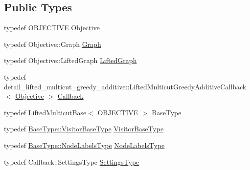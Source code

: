 \subsection*{Public Types}
\begin{DoxyCompactItemize}
\item 
typedef O\+B\+J\+E\+C\+T\+I\+V\+E \hyperlink{classnifty_1_1graph_1_1optimization_1_1lifted__multicut_1_1LiftedMulticutGreedyAdditive_ab91462949e43bb7acc99bf76e9199eb1}{Objective}
\item 
typedef Objective\+::\+Graph \hyperlink{classnifty_1_1graph_1_1optimization_1_1lifted__multicut_1_1LiftedMulticutGreedyAdditive_a1c36d77eb80c7a1f831580d9bd317a2a}{Graph}
\item 
typedef Objective\+::\+Lifted\+Graph \hyperlink{classnifty_1_1graph_1_1optimization_1_1lifted__multicut_1_1LiftedMulticutGreedyAdditive_a15aabdbf9adee9f89b5108d75699172f}{Lifted\+Graph}
\item 
typedef detail\+\_\+lifted\+\_\+multicut\+\_\+greedy\+\_\+additive\+::\+Lifted\+Multicut\+Greedy\+Additive\+Callback$<$ \hyperlink{classnifty_1_1graph_1_1optimization_1_1lifted__multicut_1_1LiftedMulticutGreedyAdditive_ab91462949e43bb7acc99bf76e9199eb1}{Objective} $>$ \hyperlink{classnifty_1_1graph_1_1optimization_1_1lifted__multicut_1_1LiftedMulticutGreedyAdditive_abf11c8446b89d894ab323829ffdd9860}{Callback}
\item 
typedef \hyperlink{classnifty_1_1graph_1_1optimization_1_1lifted__multicut_1_1LiftedMulticutBase}{Lifted\+Multicut\+Base}$<$ O\+B\+J\+E\+C\+T\+I\+V\+E $>$ \hyperlink{classnifty_1_1graph_1_1optimization_1_1lifted__multicut_1_1LiftedMulticutGreedyAdditive_a6829b614366e47118c6cb428ba5496e9}{Base\+Type}
\item 
typedef \hyperlink{classnifty_1_1graph_1_1optimization_1_1common_1_1SolverBase_a5a14d64c70a9cc0eebc7d71d2b089f9b}{Base\+Type\+::\+Visitor\+Base\+Type} \hyperlink{classnifty_1_1graph_1_1optimization_1_1lifted__multicut_1_1LiftedMulticutGreedyAdditive_a3620357c0df85e5305861ceb408c9bf3}{Visitor\+Base\+Type}
\item 
typedef \hyperlink{classnifty_1_1graph_1_1optimization_1_1common_1_1SolverBase_a6e4e465f3b6e039882669fcfb9714818}{Base\+Type\+::\+Node\+Labels\+Type} \hyperlink{classnifty_1_1graph_1_1optimization_1_1lifted__multicut_1_1LiftedMulticutGreedyAdditive_a91a2db6b526ecf8fe9ad4478c068cbef}{Node\+Labels\+Type}
\item 
typedef Callback\+::\+Settings\+Type \hyperlink{classnifty_1_1graph_1_1optimization_1_1lifted__multicut_1_1LiftedMulticutGreedyAdditive_a429990d7720121fd3832a7b32cda8732}{Settings\+Type}
\end{DoxyCompactItemize}
